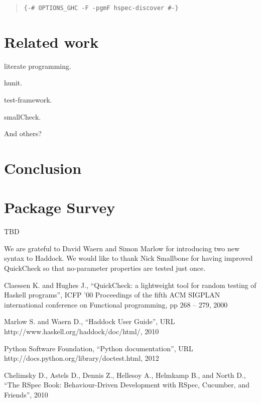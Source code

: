 \documentclass[preprint]{sigplanconf}
\begin{document}
\begin{quote}
\small
\begin{verbatim}
{-# OPTIONS_GHC -F -pgmF hspec-discover #-}
\end{verbatim}
\end{quote}

\section{Related work}

literate programming.

hunit.

test-framework.

smallCheck.

And others?

\section{Conclusion}

\appendix

\section{Package Survey}

TBD

\acks

We are grateful to David Waern and Simon Marlow
for introducing two new syntax to Haddock.
We would like to thank
Nick Smallbone for having improved QuickCheck so that no-parameter properties are tested just once.






\begin{thebibliography}{}
\softraggedright

Claessen K. and Hughes J., 
``QuickCheck: a lightweight tool for random testing of Haskell programs'',
ICFP '00 Proceedings of the fifth ACM SIGPLAN international conference on Functional programming,
pp 268 -- 279,
2000

Marlow S. and Waern D.,
``Haddock User Guide'',
URL http://www.haskell.org/haddock/doc/html/,
2010

Python Software Foundation, 
``Python documentation'', 
URL http://docs.python.org/library/doctest.html,
2012

Chelimsky D.,
Astels D., Dennis Z., Hellesoy A., Helmkamp B., and North D.,
``The RSpec Book: Behaviour-Driven 
Development with RSpec, Cucumber, and Friends'',
2010

\end{thebibliography}
\end{document}
